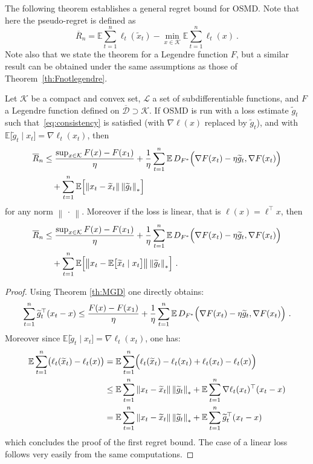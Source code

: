 \documentclass[11pt]{hackednow}
\newcommand{\E}{\mathbb{E}}
\newcommand{\cL}{\mathcal{L}}
\newcommand{\cK}{\mathcal{K}}
\newcommand{\oD}{\overline{\mathcal{D}}}
\newcommand{\oR}{\overline{R}}
\renewcommand{\tilde}{\widetilde}
\newcommand{\norm}[1]{\left\|{#1}\right\|}
\begin{document}
The following theorem establishes a general regret bound for OSMD. Note that here the pseudo-regret is defined as
$$\oR_n = \E \sum_{t=1}^n \ell_t(\tilde{x}_t) - \min_{x \in \cK} \E \sum_{t=1}^n \ell_t(x)~.$$
Note also that we state the theorem for a Legendre function $F$, but a similar result can be obtained under the same assumptions as those of Theorem~\ref{th:Fnotlegendre}.
%
\begin{theorem} \label{th:OSMD2}
Let $\cK$ be a compact and convex set, $\cL$ a set of subdifferentiable functions, and $F$ a Legendre function defined on $\oD \supset \cK$. If OSMD is run with a loss estimate $\tilde{g}_t$ such that~\eqref{eq:consistency} is satisfied (with $\nabla \ell(x)$ replaced by $\tilde{g}_t$), and with $\E\bigl[\tilde{g}_t \mid x_t\bigr] =\nabla \ell_t(x_t)$, then
\begin{align*}
\oR_n & \leq \frac{\sup_{x \in \cK} F(x) - F(x_1)}{\eta} + \frac{1}{\eta} \sum_{t=1}^n \E\, D_{F^*}\Bigl(\nabla F(x_t) - \eta \tilde{g}_t, \nabla F(x_t)\Bigr) \\
&\quad + \sum_{t=1}^n \E\Bigl[\norm{x_t - \tilde{x}_t}  \norm{\tilde{g}_t}_*\Bigr]
\end{align*}
for any norm $\norm{\,\cdot\,}$.
%
Moreover if the loss is linear, that is $\ell(x) = \ell^{\top} x$, then
\begin{align*}
\oR_n & \leq \frac{\sup_{x \in \cK} F(x) - F(x_1)}{\eta} + \frac{1}{\eta} \sum_{t=1}^n \E\, D_{F^*}\Bigl(\nabla F(x_t) - \eta \tilde{g}_t, \nabla F(x_t)\Bigr) \\
&\quad + \sum_{t=1}^n \E\Bigl[\norm{x_t - \E\bigl[\tilde{x}_t \mid x_t\bigr]} \norm{\tilde{g}_t}_*\Bigr]~.
\end{align*}
\end{theorem}
%
\begin{proof}
Using Theorem \ref{th:MGD} one directly obtains:
$$\sum_{t=1}^n \tilde{g}_t^{\top} (x_t - x) \leq \frac{F(x) - F(x_1)}{\eta} + \frac{1}{\eta} \sum_{t=1}^n \E\, D_{F^*} \Bigl(\nabla F(x_t) - \eta \tilde{g}_t, \nabla F(x_t)\Bigr)~.$$
Moreover since $\E\bigl[\tilde{g}_t \mid x_t\bigr] =\nabla \ell_t(x_t)$, one has:
\begin{align*}
\E \sum_{t=1}^n \bigl( \ell_t(\tilde{x}_t) - \ell_t(x) \bigr) & = \E \sum_{t=1}^n \Bigl( \ell_t(\tilde{x}_t) - \ell_t(x_t) + \ell_t(x_t) - \ell_t(x) \Bigr) \\
& \leq \E \sum_{t=1}^n \norm{x_t - \tilde{x}_t} \norm{\tilde{g}_t}_* + \E \sum_{t=1}^n \nabla \ell_t(x_t)^{\top} (x_t - x) \\
& = \E \sum_{t=1}^n \norm{x_t - \tilde{x}_t} \norm{\tilde{g}_t}_* + \E \sum_{t=1}^n \tilde{g}_t^{\top} (x_t - x)
\end{align*}
which concludes the proof of the first regret bound. The case of a linear loss follows very easily from the same computations.
\end{proof}
\end{document}

